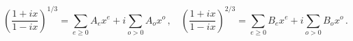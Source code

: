 \begin{equation}
\left( \frac{1+ix}{1-ix}\right) ^{1/3}=\sum_{e\geq
0}A_{e}x^{e}+i\sum_{o>0}A_{o}x^{o}\,,~~~~\left( \frac{1+ix}{1-ix}\right)
^{2/3}=\sum_{e\geq 0}B_{e}x^{e}+i\sum_{o>0}B_{o}x^{o}\,.
\end{equation}

